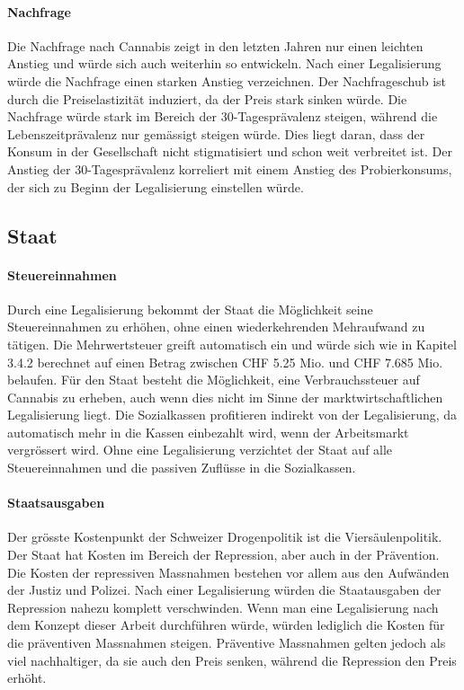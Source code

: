 \documentclass[../main.tex]{subfiles}
\begin{document}
	\paragraph{Nachfrage}
	Die Nachfrage nach Cannabis zeigt in den letzten Jahren nur einen leichten Anstieg und würde sich auch weiterhin so entwickeln.
	Nach einer Legalisierung würde die Nachfrage einen starken Anstieg verzeichnen.
	Der Nachfrageschub ist durch die Preiselastizität induziert, da der Preis stark sinken würde.
	Die Nachfrage würde stark im Bereich der 30-Tagesprävalenz steigen, während die Lebenszeitprävalenz nur gemässigt steigen würde.
	Dies liegt daran, dass der Konsum in der Gesellschaft nicht stigmatisiert und schon weit verbreitet ist.
	Der Anstieg der 30-Tagesprävalenz korreliert mit einem Anstieg des Probierkonsums, der sich zu Beginn der Legalisierung einstellen würde.
	
	\subsection{Staat}
	
	\paragraph{Steuereinnahmen}
	Durch eine Legalisierung bekommt der Staat die Möglichkeit seine Steuereinnahmen zu erhöhen, ohne einen wiederkehrenden Mehraufwand zu tätigen.
	Die Mehrwertsteuer greift automatisch ein und würde sich wie in Kapitel 3.4.2 berechnet auf einen Betrag zwischen CHF 5.25 Mio. und CHF 7.685 Mio. belaufen. 
	Für den Staat besteht die Möglichkeit, eine Verbrauchssteuer auf Cannabis zu erheben, auch wenn dies nicht im Sinne der marktwirtschaftlichen Legalisierung liegt.
	Die Sozialkassen profitieren indirekt von der Legalisierung, da automatisch mehr in die Kassen einbezahlt wird, wenn der Arbeitsmarkt vergrössert wird.
	Ohne eine Legalisierung verzichtet der Staat auf alle Steuereinnahmen und die passiven Zuflüsse in die Sozialkassen.
	
	
	\paragraph{Staatsausgaben}
	Der grösste Kostenpunkt der Schweizer Drogenpolitik ist die Viersäulenpolitik.
	Der Staat hat Kosten im Bereich der Repression, aber auch in der Prävention.
	Die Kosten der repressiven Massnahmen bestehen vor allem aus den Aufwänden der Justiz und Polizei.
	Nach einer Legalisierung würden die Staatausgaben der Repression nahezu komplett verschwinden.
	Wenn man eine Legalisierung nach dem Konzept dieser Arbeit durchführen würde, würden lediglich die Kosten für die präventiven Massnahmen steigen.
	Präventive Massnahmen gelten jedoch als viel nachhaltiger, da sie auch den Preis senken, während die Repression den Preis erhöht.
	
\end{document}
